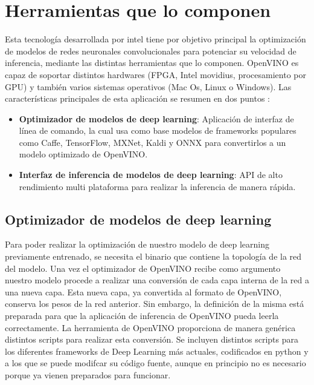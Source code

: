 \section{Herramientas que lo componen}\label{sec:herramientas-que-lo-componen}
Esta tecnología desarrollada por intel tiene por objetivo principal la optimización de modelos de redes neuronales convolucionales para potenciar su velocidad de inferencia, mediante las distintas herramientas que lo componen.
OpenVINO es capaz de soportar distintos hardwares (FPGA, Intel movidius, procesamiento por GPU\@) y también varios sistemas operativos (Mac Os, Linux o Windows).
Las características principales de esta aplicación se resumen en dos puntos :
\begin{itemize}
    \item \textbf{Optimizador de modelos de deep learning}: Aplicación de interfaz de línea de comando, la cual usa como base modelos de frameworks populares como Caffe, TensorFlow, MXNet, Kaldi y ONNX para convertirlos a un modelo optimizado de OpenVINO.
    \item \textbf{Interfaz de inferencia de modelos de deep learning}: API de alto rendimiento multi plataforma para realizar la inferencia de manera rápida.
\end{itemize}

\subsection{Optimizador de modelos de deep learning}\label{subsec:optimizador-de-modelos-de-deep-learning}
Para poder realizar la optimización de nuestro modelo de deep learning previamente entrenado, se necesita el binario que contiene la topología de la red del modelo. Una vez el optimizador de OpenVINO recibe como argumento nuestro modelo procede a realizar una conversión de cada capa interna de la red a una nueva capa.
Esta nueva capa, ya convertida al formato de OpenVINO, conserva los pesos de la red anterior.
Sin embargo, la definición de la misma está preparada para que la aplicación de inferencia de OpenVINO pueda leerla correctamente.
La herramienta de OpenVINO proporciona de manera genérica distintos scripts para realizar esta conversión.
Se incluyen distintos scripts para los diferentes frameworks de Deep Learning más actuales, codificados en python y a los que se puede modifcar su código fuente, aunque en principio no es necesario porque ya vienen preparados para funcionar.

